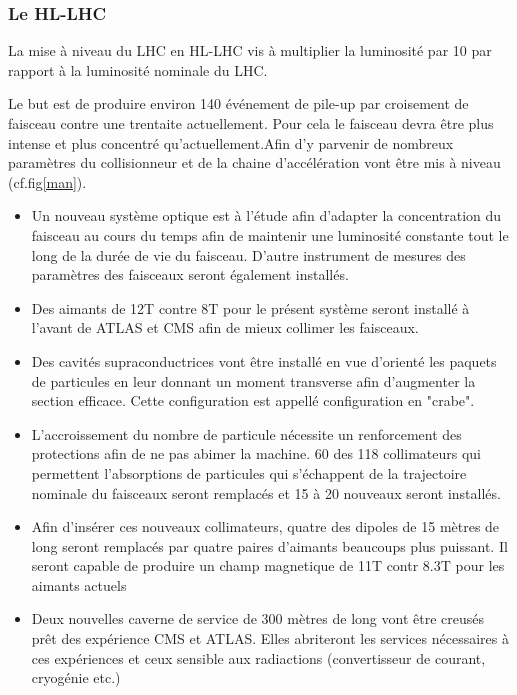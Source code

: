 \subsubsection{Le HL-LHC}
La mise à niveau du LHC en HL-LHC vis à multiplier la luminosité par 10 par rapport à la luminosité nominale du LHC.

Le but est de produire environ 140 événement de pile-up par croisement de faisceau contre une trentaite actuellement. Pour cela le faisceau devra être plus intense et plus concentré qu'actuellement.Afin d'y parvenir de nombreux paramètres du collisionneur et de la chaine d'accélération vont être mis à niveau (cf.fig\ref{man}).

\begin{itemize}[label=$\bullet$]
	
 \item Un nouveau système optique est à l'étude afin d'adapter la concentration du faisceau au cours du temps afin de maintenir une luminosité constante tout le long de la durée de vie du faisceau. D'autre instrument de mesures des paramètres des faisceaux seront également installés.
 
 \item Des aimants de 12T contre 8T pour le présent système seront installé à l'avant de ATLAS et CMS afin de mieux collimer les faisceaux.
 
 \item Des cavités supraconductrices vont être installé en vue d'orienté les paquets de particules en leur donnant un moment transverse afin d'augmenter la section efficace. Cette configuration est appellé configuration en "crabe".
 
 \item L'accroissement du nombre de particule nécessite un renforcement des protections afin de ne pas abimer la machine. 60 des 118 collimateurs qui permettent l'absorptions de particules qui s'échappent de la trajectoire nominale du faisceaux seront remplacés et 15 à 20 nouveaux seront installés.
 
 \item Afin d'insérer ces nouveaux collimateurs, quatre des dipoles de 15 mètres de long seront remplacés par quatre paires d'aimants beaucoups plus puissant. Il seront capable de produire un champ magnetique de 11T contr 8.3T pour les aimants actuels
 
 \item Deux nouvelles caverne de service de 300 mètres de long vont être creusés prêt des expérience CMS et ATLAS. Elles abriteront les services nécessaires à ces expériences et ceux sensible aux radiactions (convertisseur de courant, cryogénie etc.)
 

\end{itemize}
